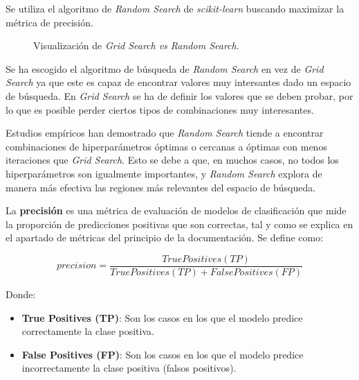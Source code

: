 \documentclass[12pt,letterpaper]{article}
\begin{document}
Se utiliza el algoritmo de \textit{Random Search} de \textit{scikit-learn} buscando maximizar la métrica de precisión.

\begin{figure}[htp]
    \centering
    \caption{Visualización de \textit{Grid Search vs Random Search}.}
    \label{fig:grid_vs_rando}
\end{figure}

Se ha escogido el algoritmo de búsqueda de \textit{Random Search} en vez de \textit{Grid Search} ya que este es capaz de encontrar valores muy intersantes dado un espacio de búsqueda. En \textit{Grid Search} se ha de definir los valores que se deben probar, por lo que es posible perder ciertos tipos de combinaciones muy interesantes.

Estudios empíricos han demostrado que \textit{Random Search} tiende a encontrar combinaciones de hiperparámetros óptimas o cercanas a óptimas con menos iteraciones que \textit{Grid Search}. Esto se debe a que, en muchos casos, no todos los hiperparámetros son igualmente importantes, y \textit{Random Search} explora de manera más efectiva las regiones más relevantes del espacio de búsqueda.

La \textbf{precisión} es una métrica de evaluación de modelos de clasificación que mide la proporción de predicciones positivas que son correctas, tal y como se explica en el apartado de métricas del principio de la documentación. Se define como:

\begin{equation}
    precision = \frac{True Positives (TP)}{True Positives (TP) + False Positives (FP)}
\end{equation}

Donde:
\begin{itemize}
    \item \textbf{True Positives (TP)}: Son los casos en los que el modelo predice correctamente la clase positiva.
    \item \textbf{False Positives (FP)}: Son los casos en los que el modelo predice incorrectamente la clase positiva (falsos positivos).
\end{itemize}
\end{document}
